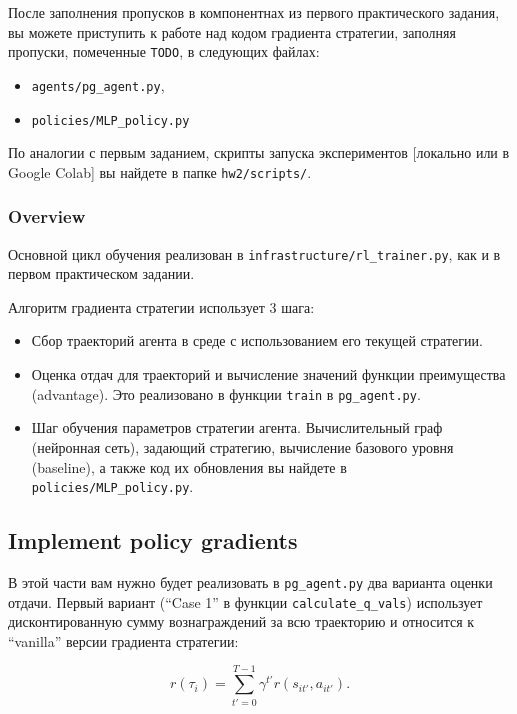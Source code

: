 \documentclass[12pt, oneside]{article}
\begin{document}
После заполнения пропусков в компонентнах из первого практического задания, вы можете приступить к работе над кодом градиента стратегии, заполняя пропуски, помеченные \verb|TODO|, в следующих файлах:

\begin{itemize}
    \item \verb|agents/pg_agent.py|,
    \item \verb|policies/MLP_policy.py|
\end{itemize}

По аналогии с первым заданием, скрипты запуска экспериментов [локально или в Google Colab] вы найдете в папке \verb|hw2/scripts/|.

\subsubsection{Overview}

Основной цикл обучения реализован в \verb|infrastructure/rl_trainer.py|, как и в первом практическом задании.

Алгоритм градиента стратегии использует 3 шага:

\begin{itemize}
    \item Сбор траекторий агента в среде с использованием его текущей стратегии.
    \item Оценка отдач для траекторий и вычисление значений функции преимущества (advantage). Это реализовано в функции \verb|train| в \verb|pg_agent.py|.
    \item Шаг обучения параметров стратегии агента. Вычислительный граф (нейронная сеть), задающий стратегию, вычисление базового уровня (baseline), а также код их обновления вы найдете в \verb|policies/MLP_policy.py|.
\end{itemize}

\subsection{Implement policy gradients}

В этой части вам нужно будет реализовать в \verb|pg_agent.py| два варианта оценки отдачи. Первый вариант (``Case 1'' в функции \verb|calculate_q_vals|) использует дисконтированную сумму вознаграждений за всю траекторию и относится к ``vanilla'' версии градиента стратегии:

\begin{equation}
    r(\tau_i) = \sum_{t' = 0}^{T - 1} {\gamma^{t'} r(s_{it'}, a_{it'})}.
\end{equation}
\end{document}
